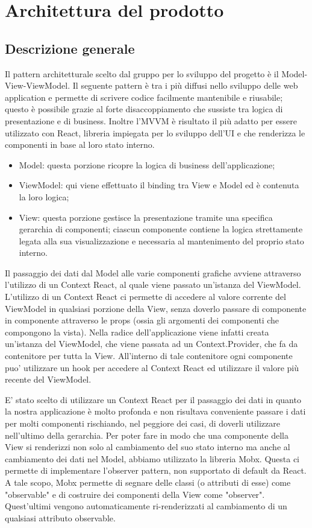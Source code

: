 \section{Architettura del prodotto}\label{section:architettura del prodotto}
\subsection{Descrizione generale}
Il pattern architetturale scelto dal gruppo per lo sviluppo del progetto è il Model-View-ViewModel. Il
seguente pattern è tra i più diffusi nello sviluppo delle web application e permette di scrivere codice
facilmente mantenibile e riusabile; questo è possibile grazie al forte disaccoppiamento che sussiste tra
logica di presentazione e di business. Inoltre l'MVVM è risultato il più adatto per essere utilizzato con
React, libreria impiegata per lo sviluppo dell'UI e che renderizza le componenti in base al loro stato
interno.
\begin{itemize}
\item Model: questa porzione ricopre la logica di business dell'applicazione; %
\item ViewModel: qui viene effettuato il binding tra View e Model ed è contenuta la loro logica;
\item View: questa porzione gestisce la presentazione tramite una specifica gerarchia di componenti;
ciascun componente contiene la logica strettamente legata alla sua visualizzazione e necessaria al
mantenimento del proprio stato interno.
\end{itemize}

Il passaggio dei dati dal Model alle varie componenti grafiche avviene attraverso l'utilizzo di un Context
React, al quale viene passato un'istanza del ViewModel. L'utilizzo di un Context React ci permette di
accedere al valore corrente del ViewModel in qualsiasi porzione della View, senza doverlo passare di
componente in componente attraverso le props (ossia gli argomenti dei componenti che compongono la
vista). Nella radice dell'applicazione viene infatti creata un'istanza del ViewModel, che viene passata
ad un Context.Provider, che fa da contenitore per tutta la View. All'interno di tale contenitore ogni
componente puo' utilizzare un hook per accedere al Context React ed utilizzare il valore più recente del ViewModel.

E' stato scelto di utilizzare un Context React per il passaggio dei dati in quanto la nostra applicazione è
molto profonda e non risultava conveniente passare i dati per molti componenti rischiando, nel peggiore
dei casi, di doverli utilizzare nell'ultimo della gerarchia.
Per poter fare in modo che una componente della View si renderizzi non solo al cambiamento del
suo stato interno ma anche al cambiamento dei dati nel Model, abbiamo utilizzato la libreria Mobx.
Questa ci permette di implementare l'observer pattern, non supportato di default da React. A tale
scopo, Mobx permette di segnare delle classi (o attributi di esse) come "observable" e di costruire
dei componenti della View come "observer". Quest'ultimi vengono automaticamente ri-renderizzati al
cambiamento di un qualsiasi attributo observable.

